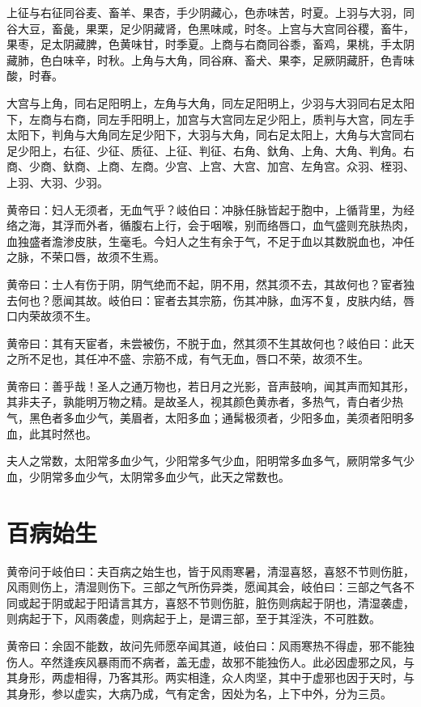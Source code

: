 \documentclass[12pt,UTF8]{ctexbook}
\begin{document}
	上征与右征同谷麦、畜羊、果杏，手少阴藏心，色赤味苦，时夏。上羽与大羽，同谷大豆，畜彘，果栗，足少阴藏肾，色黑味咸，时冬。上宫与大宫同谷稷，畜牛，果枣，足太阴藏脾，色黄味甘，时季夏。上商与右商同谷黍，畜鸡，果桃，手太阴藏肺，色白味辛，时秋。上角与大角，同谷麻、畜犬、果李，足厥阴藏肝，色青味酸，时春。
	
	大宫与上角，同右足阳明上，左角与大角，同左足阳明上，少羽与大羽同右足太阳下，左商与右商，同左手阳明上，加宫与大宫同左足少阳上，质判与大宫，同左手太阳下，判角与大角同左足少阳下，大羽与大角，同右足太阳上，大角与大宫同右足少阳上，右征、少征、质征、上征、判征、右角、釱角、上角、大角、判角。右商、少商、釱商、上商、左商。少宫、上宫、大宫、加宫、左角宫。众羽、桎羽、上羽、大羽、少羽。
	
	黄帝曰：妇人无须者，无血气乎？岐伯曰：冲脉任脉皆起于胞中，上循背里，为经络之海，其浮而外者，循腹右上行，会于咽喉，别而络唇口，血气盛则充肤热肉，血独盛者澹渗皮肤，生毫毛。今妇人之生有余于气，不足于血以其数脱血也，冲任之脉，不荣口唇，故须不生焉。
	
	黄帝曰：士人有伤于阴，阴气绝而不起，阴不用，然其须不去，其故何也？宦者独去何也？愿闻其故。岐伯曰：宦者去其宗筋，伤其冲脉，血泻不复，皮肤内结，唇口内荣故须不生。
	
	黄帝曰：其有天宦者，未尝被伤，不脱于血，然其须不生其故何也？岐伯曰：此天之所不足也，其任冲不盛、宗筋不成，有气无血，唇口不荣，故须不生。
	
	黄帝曰：善乎哉！圣人之通万物也，若日月之光影，音声鼓响，闻其声而知其形，其非夫子，孰能明万物之精。是故圣人，视其颜色黄赤者，多热气，青白者少热气，黑色者多血少气，美眉者，太阳多血；通髯极须者，少阳多血，美须者阳明多血，此其时然也。
	
	夫人之常数，太阳常多血少气，少阳常多气少血，阳明常多血多气，厥阴常多气少血，少阴常多血少气，太阴常多血少气，此天之常数也。
	
	\chapter{百病始生}
	
	黄帝问于岐伯曰：夫百病之始生也，皆于风雨寒暑，清湿喜怒，喜怒不节则伤脏，风雨则伤上，清湿则伤下。三部之气所伤异类，愿闻其会，岐伯曰：三部之气各不同或起于阴或起于阳请言其方，喜怒不节则伤脏，脏伤则病起于阴也，清湿袭虚，则病起于下，风雨袭虚，则病起于上，是谓三部，至于其淫泆，不可胜数。
	
	黄帝曰：余固不能数，故问先师愿卒闻其道，岐伯曰：风雨寒热不得虚，邪不能独伤人。卒然逢疾风暴雨而不病者，盖无虚，故邪不能独伤人。此必因虚邪之风，与其身形，两虚相得，乃客其形。两实相逢，众人肉坚，其中于虚邪也因于天时，与其身形，参以虚实，大病乃成，气有定舍，因处为名，上下中外，分为三员。
	
\end{document}
